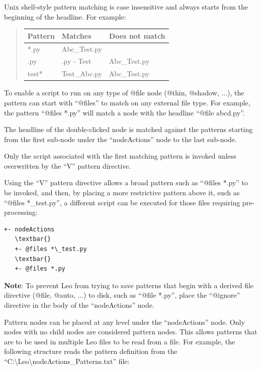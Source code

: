 \documentclass[a4paper,10pt,english]{sphinxmanual}
\begin{document}
Unix shell-style pattern matching is case insensitive and always starts from
the beginning of the headline.  For example:
\begin{quote}

\begin{tabulary}{\linewidth}{|L|L|L|}
\hline
\textbf{
Pattern
} & \textbf{
Matches
} & \textbf{
Does not match
}\\\hline

*.py
 & 
Abc\_Test.py
 & \\\hline

.py
 & 
.py - Test
 & 
Abc\_Test.py
\\\hline

test*
 & 
Test\_Abc.py
 & 
Abc\_Test.py
\\\hline
\end{tabulary}

\end{quote}

To enable a script to run on any type of @file node (@thin, @shadow, ...),
the pattern can start with ``@files'' to match on any
external file type.  For example, the pattern ``@files *.py'' will
match a node with the headline ``@file abcd.py''.

The headline of the double-clicked node is matched against the patterns
starting from the first sub-node under the ``nodeActions'' node to the last
sub-node.

Only the script associated with the first matching pattern is
invoked unless overwritten by the ``V'' pattern directive.

Using the ``V'' pattern directive allows a broad pattern such
as ``@files *.py'' to be invoked, and then, by placing a more restrictive
pattern above it, such as ``@files *\_test.py'', a different script can be
executed for those files requiring pre-processing:

\begin{Verbatim}[commandchars=\\\{\}]
+- nodeActions
   \textbar{}
   +- @files *\_test.py
   \textbar{}
   +- @files *.py
\end{Verbatim}

\textbf{Note}: To prevent Leo from trying to save patterns that begin with a derived
file directive (@file, @auto, ...) to disk, such as ``@file *.py'', place the
``@ignore'' directive in the body of the ``nodeActions'' node.

Pattern nodes can be placed at any level under the ``nodeActions'' node.
Only nodes with no child nodes are considered pattern nodes.
This allows patterns that are to be used in multiple Leo files to be read
from a file.  For example, the following structure reads the pattern
definition from the ``C:\textbackslash{}Leo\textbackslash{}nodeActions\_Patterns.txt'' file:
\end{document}
